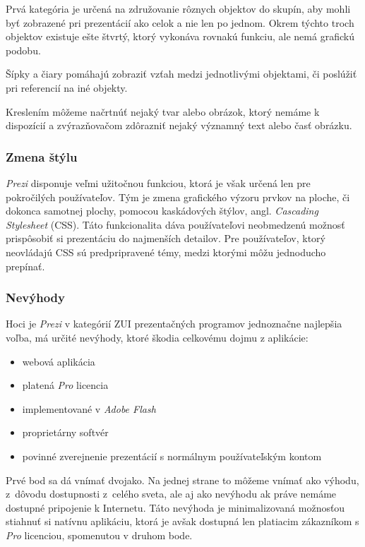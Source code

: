 Prvá kategória je určená na združovanie rôznych objektov do skupín, aby mohli byť zobrazené pri prezentácií ako celok a nie len po jednom. Okrem týchto troch objektov existuje ešte štvrtý, ktorý vykonáva rovnakú funkciu, ale nemá grafickú podobu.

Šípky a čiary pomáhajú zobraziť vzťah medzi jednotlivými objektami, či poslúžiť pri referencií na iné objekty.

Kreslením môžeme načrtnúť nejaký tvar alebo obrázok, ktorý nemáme k dispozícií a zvýrazňovačom zdôrazniť nejaký významný text alebo časť obrázku.  

\subsubsection{Zmena štýlu}

\textit{Prezi} disponuje veľmi užitočnou funkciou, ktorá je však určená len pre pokročilých používateľov. Tým je zmena grafického výzoru prvkov na ploche, či dokonca samotnej plochy, pomocou kaskádových štýlov, angl. \textit{Cascading Stylesheet} (CSS). Táto funkcionalita dáva používateľovi neobmedzenú možnosť prispôsobiť si prezentáciu do najmenších detailov. Pre používateľov, ktorý neovládajú CSS sú predpripravené témy, medzi ktorými môžu jednoducho prepínať.

\subsubsection{Nevýhody}

Hoci je \textit{Prezi} v kategórií ZUI prezentačných programov jednoznačne najlepšia voľba, má určité nevýhody, ktoré škodia celkovému dojmu z aplikácie:

\begin{itemize}
 \item webová aplikácia
 \item platená \textit{Pro} licencia
 \item implementované v \textit{Adobe Flash}
 \item proprietárny softvér
 \item povinné zverejnenie prezentácií s normálnym používateľským kontom
\end{itemize}

Prvé bod sa dá vnímať dvojako. Na jednej strane to môžeme vnímať ako výhodu, z~dôvodu dostupnosti z~celého sveta, ale aj ako nevýhodu ak práve nemáme dostupné pripojenie k  Internetu. Táto nevýhoda je minimalizovaná možnosťou stiahnuť si natívnu aplikáciu, ktorá je avšak dostupná len platiacim zákazníkom s \textit{Pro} licenciou, spomenutou v druhom bode.


